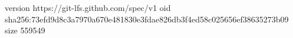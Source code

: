 version https://git-lfs.github.com/spec/v1
oid sha256:73efd9d8c3a7970a670e481830e3fdae826db3f4ed58c025656ef38635273b09
size 559549
